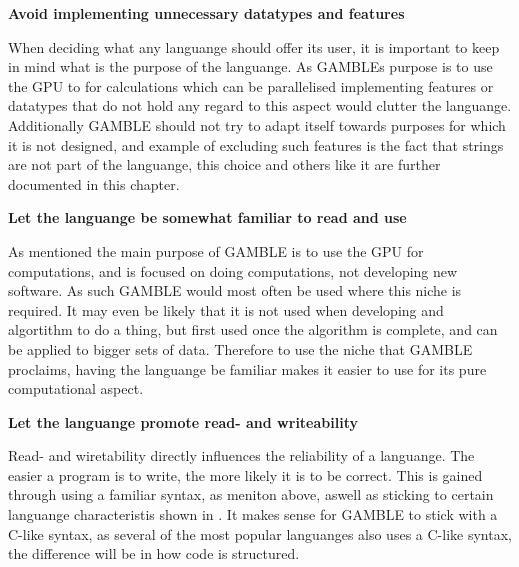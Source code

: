 \textbf{Avoid implementing unnecessary datatypes and features}

When deciding what any languange should offer its user, it is important to keep in mind what is the purpose of the languange.
As GAMBLEs purpose is to use the GPU to for calculations which can be parallelised implementing features or datatypes that do not hold any regard to this aspect would clutter the languange.
Additionally GAMBLE should not try to adapt itself towards purposes for which it is not designed, and example of excluding such features is the fact that strings are not part of the languange, this choice and others like it are further documented in this chapter.

\textbf{Let the languange be somewhat familiar to read and use}

As mentioned the main purpose of GAMBLE is to use the GPU for computations, and is focused on doing computations, not developing new software.
As such GAMBLE would most often be used where this niche is required.
It may even be likely that it is not used when developing and algortithm to do a thing, but first used once the algorithm is complete, and can be applied to bigger sets of data.
Therefore to use the niche that GAMBLE proclaims, having the languange be familiar makes it easier to use for its pure computational aspect.

\textbf{Let the languange promote read- and writeability}

Read- and wiretability directly influences the reliability of a languange. 
The easier a program is to write, the more likely it is to be correct.\citep{Sebesta}
This is gained through using a familiar syntax, as meniton above, aswell as sticking to certain languange characteristis shown in \myref{}.
It makes sense for GAMBLE to stick with a C-like syntax, as several of the most popular languanges also uses a C-like syntax, the difference will be in how code is structured.\citep{TIOBE}